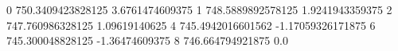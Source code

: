 0 750.3409423828125 3.6761474609375
1 748.5889892578125 1.9241943359375
2 747.760986328125 1.09619140625
4 745.4942016601562 -1.17059326171875
6 745.300048828125 -1.36474609375
8 746.664794921875 0.0
